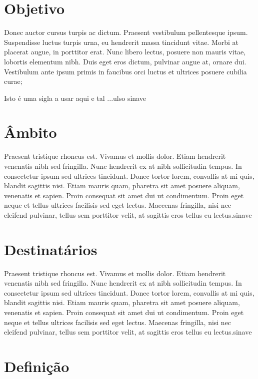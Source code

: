 \section{Objetivo}\label{sec:objetivo}

Donec auctor cursus turpis ac dictum. Praesent vestibulum pellentesque ipsum. Suspendisse luctus turpis urna, eu hendrerit massa tincidunt vitae. Morbi at placerat augue, in porttitor erat. Nunc libero lectus, posuere non mauris vitae, lobortis elementum nibh. Duis eget eros dictum, pulvinar augue at, ornare dui. Vestibulum ante ipsum primis in faucibus orci luctus et ultrices posuere cubilia curae;

Isto é uma sigla a usar aqui e tal ...\gls{ulso} \gls{sinave}


\section{Âmbito}\label{sec:ambito}



Praesent tristique rhoncus est. Vivamus et mollis dolor. Etiam hendrerit venenatis nibh sed fringilla. Nunc hendrerit ex at nibh sollicitudin tempus. In consectetur ipsum sed ultrices tincidunt. Donec tortor lorem, convallis at mi quis, blandit sagittis nisi. Etiam mauris quam, pharetra sit amet posuere aliquam, venenatis et sapien. Proin consequat sit amet dui ut condimentum. Proin eget neque et tellus ultrices facilisis sed eget lectus. Maecenas fringilla, nisi nec eleifend pulvinar, tellus sem porttitor velit, at sagittis eros tellus eu lectus.\acrshort{sinave}


\section{Destinatários}\label{sec:destinatarios}

Praesent tristique rhoncus est. Vivamus et mollis dolor. Etiam hendrerit venenatis nibh sed fringilla. Nunc hendrerit ex at nibh sollicitudin tempus. In consectetur ipsum sed ultrices tincidunt. Donec tortor lorem, convallis at mi quis, blandit sagittis nisi. Etiam mauris quam, pharetra sit amet posuere aliquam, venenatis et sapien. Proin consequat sit amet dui ut condimentum. Proin eget neque et tellus ultrices facilisis sed eget lectus. Maecenas fringilla, nisi nec eleifend pulvinar, tellus sem porttitor velit, at sagittis eros tellus eu lectus.\acrshort{sinave}



\section{Definição}\label{sec:definicao}

